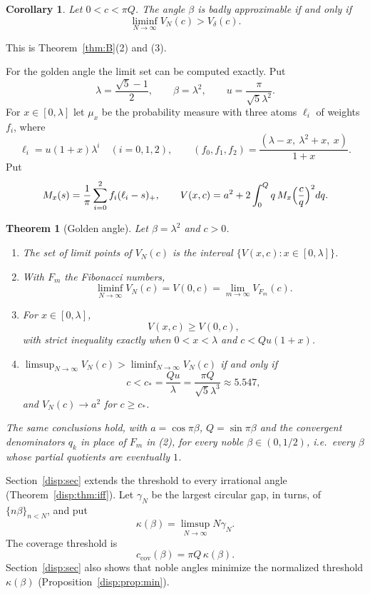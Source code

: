 \documentclass[11pt]{amsart}
\newtheorem{mainthm}{Theorem}
\newtheorem{corollary}[theorem]{Corollary}
\theoremstyle{remark}
\newcommand{\Vd}{V_\delta}
\begin{document}
\begin{corollary}\label{cor:bad}
Let $0<c<\pi Q$. The angle $\beta$ is badly approximable if and only if
\[
\liminf_{N\to\infty} V_N(c)>\Vd(c).
\]
\end{corollary}

This is Theorem~\ref{thm:B}(2) and (3).

For the golden angle the limit set can be computed exactly. Put
\[
\lambda=\frac{\sqrt5-1}{2},\qquad \beta=\lambda^2,\qquad u=\frac{\pi}{\sqrt5\lambda^2}.
\]
For $x\in[0,\lambda]$ let $\mu_x$ be the probability measure with three atoms
$\ell_i$ of weights $f_i$, where
\[
\ell_i=u(1+x)\lambda^i\quad(i=0,1,2),\qquad
(f_0,f_1,f_2)=\frac{(\lambda-x,\ \lambda^2+x,\ x)}{1+x}.
\]
Put
\begin{equation}\label{eq:Vx}
M_x(s)=\frac1\pi\sum_{i=0}^{2}f_i(\ell_i-s)_+,\qquad
V(x,c)=a^2+2\int_0^Q q\,M_x\Bigl(\frac cq\Bigr)^2dq .
\end{equation}

\begin{mainthm}[Golden angle]\label{thm:C}
Let $\beta=\lambda^2$ and $c>0$.
\begin{enumerate}
\item The set of limit points of $V_N(c)$ is the interval $\{V(x,c):x\in[0,\lambda]\}$.
\item With $F_m$ the Fibonacci numbers,
\[
\liminf_{N\to\infty} V_N(c)=V(0,c)=\lim_{m\to\infty}V_{F_m}(c).
\]
\item For $x\in[0,\lambda]$,
\[
V(x,c)\ge V(0,c),
\]
with strict inequality exactly when $0<x<\lambda$ and $c<Qu(1+x)$.
\item $\limsup_{N\to\infty} V_N(c)>\liminf_{N\to\infty} V_N(c)$ if and only if
\[
c<c_*=\frac{Qu}{\lambda}=\frac{\pi Q}{\sqrt5\lambda^3}\approx 5.547,
\]
and $V_N(c)\to a^2$ for $c\ge c_*$.
\end{enumerate}
The same conclusions hold, with $a=\cos\pi\beta$, $Q=\sin\pi\beta$ and the convergent
denominators $q_k$ in place of $F_m$ in (2), for every noble $\beta\in(0,1/2)$, i.e.\ every
$\beta$ whose partial quotients are eventually $1$.
\end{mainthm}

Section~\ref{disp:sec} extends the threshold to every irrational angle
(Theorem~\ref{disp:thm:iff}). Let $\gamma_N$ be the largest circular gap, in turns, of
$\{n\beta\}_{n<N}$, and put
\[
\kappa(\beta)=\limsup_{N\to\infty}N\gamma_N .
\]
The coverage threshold is
\[
c_{\mathrm{cov}}(\beta)=\pi Q\,\kappa(\beta).
\]
Section~\ref{disp:sec} also shows that noble angles minimize the normalized threshold
$\kappa(\beta)$ (Proposition~\ref{disp:prop:min}).
\end{document}
